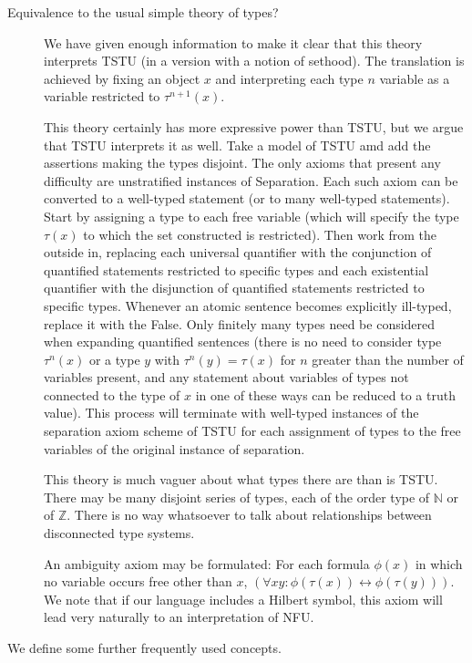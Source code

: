 \documentclass[12pt]{article}
\begin{document}
\begin{description}
\item[Equivalence to the usual simple theory of types?]  We have given enough information to make it clear that this theory interprets TSTU (in a version with a notion of sethood).  The translation is achieved by fixing
an object $x$ and interpreting each type $n$ variable as a variable restricted to $\tau^{n+1}(x)$.

This theory certainly has more expressive power than TSTU, but we argue that TSTU interprets it as well.  Take a model of TSTU amd add the assertions making the types disjoint.
The only axioms that present any difficulty are unstratified instances of Separation.  Each such axiom can be converted to a well-typed statement (or to many well-typed statements).
Start by assigning a type to each free variable (which will specify the type $\tau(x)$ to which the set constructed is restricted).  Then work from the outside in, replacing each universal quantifier
with the conjunction of quantified statements restricted to specific types and each existential quantifier with the disjunction of quantified statements restricted to specific types.
Whenever an atomic sentence becomes explicitly ill-typed, replace it with the False.  Only finitely many types need be considered when expanding quantified sentences (there is no need to consider type
$\tau^n(x)$ or a type $y$ with $\tau^n(y) = \tau(x)$ for $n$ greater than the number of variables present, and any statement about variables of types not connected to the type
of $x$ in one of these ways can be reduced to a truth value).  This process will terminate with well-typed instances of the separation axiom scheme of TSTU for each assignment
of types to the free variables of the original instance of separation.

This theory is much vaguer about what types there are than is TSTU.  There may be many disjoint series of types, each of the order type of $\mathbb N$  or of $\mathbb Z$.  There is no way whatsoever to talk about relationships between disconnected type systems.

An ambiguity axiom may be formulated:  For each formula $\phi(x)$ in which no variable occurs free other than $x$, $(\forall xy:\phi(\tau(x)) \leftrightarrow \phi(\tau(y)))$.  We note that if our language includes a Hilbert symbol, this axiom will lead very naturally to an interpretation of NFU.

\end{description}

We define some further frequently used concepts.
\end{document}
